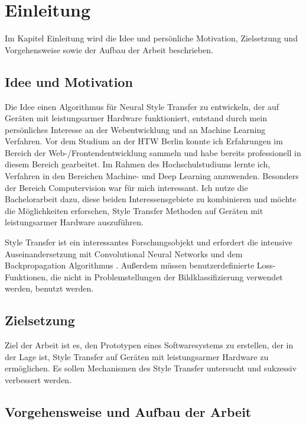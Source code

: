 \chapter{Einleitung}

Im Kapitel Einleitung wird die Idee und persönliche Motivation, Zielsetzung und Vorgehensweise sowie der Aufbau der Arbeit beschrieben.

\section{Idee und Motivation}

Die Idee einen Algorithmus für Neural Style Transfer zu entwickeln, der auf Geräten mit leistungsarmer Hardware funktioniert, entstand durch mein persönliches Interesse an der Webentwicklung und an Machine Learning Verfahren. Vor dem Studium an der HTW Berlin konnte ich Erfahrungen im Bereich der Web-/Frontendentwicklung sammeln und habe bereits professionell in diesem Bereich gearbeitet. Im Rahmen des Hochschulstudiums lernte ich, Verfahren in den Bereichen Machine- und Deep Learning anzuwenden. Besonders der Bereich Computervision war für mich interessant. Ich nutze die Bachelorarbeit dazu, diese beiden Interessensgebiete zu kombinieren und möchte die Möglichkeiten erforschen, Style Transfer Methoden auf Geräten mit leistungsarmer Hardware auszuführen.

Style Transfer ist ein interessantes Forschungsobjekt und erfordert die intensive Auseinandersetzung mit Convolutional Neural Networks \cite{lecun-gradientbased-learning-applied-1998} und dem Backpropagation Algorithmus \cite{doi:10.1162/neco.1989.1.4.541}. Außerdem müssen benutzerdefinierte Loss-Funktionen, die nicht in Problemstellungen der Bildklassifizierung verwendet werden, benutzt werden.

\section{Zielsetzung}

Ziel der Arbeit ist es, den Prototypen eines Softwaresystems zu erstellen, der in der Lage ist, Style Transfer auf Geräten mit leistungsarmer Hardware zu ermöglichen. Es sollen Mechanismen des Style Transfer untersucht und sukzessiv verbessert werden.

\section{Vorgehensweise und Aufbau der Arbeit}

